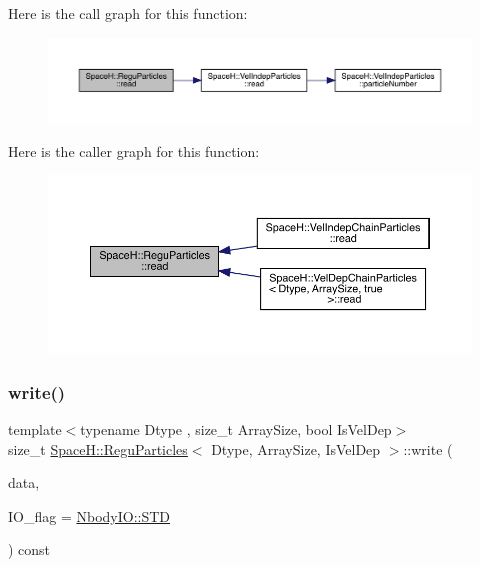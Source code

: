 Here is the call graph for this function\+:
\nopagebreak
\begin{figure}[H]
\begin{center}
\leavevmode
\includegraphics[width=350pt]{class_space_h_1_1_regu_particles_a639789e55a57427963b49a95c4e66c86_cgraph}
\end{center}
\end{figure}
Here is the caller graph for this function\+:
\nopagebreak
\begin{figure}[H]
\begin{center}
\leavevmode
\includegraphics[width=350pt]{class_space_h_1_1_regu_particles_a639789e55a57427963b49a95c4e66c86_icgraph}
\end{center}
\end{figure}
\mbox{\label{class_space_h_1_1_regu_particles_a5e6f99ab289e48790db7599fac59aa5a}} 
\subsubsection{\texorpdfstring{write()}{write()}}
{\footnotesize\ttfamily template$<$typename Dtype , size\+\_\+t Array\+Size, bool Is\+Vel\+Dep$>$ \\
size\+\_\+t \mbox{\hyperlink{class_space_h_1_1_regu_particles}{Space\+H\+::\+Regu\+Particles}}$<$ Dtype, Array\+Size, Is\+Vel\+Dep $>$\+::write (\begin{DoxyParamCaption}\item[{\mbox{\hyperlink{class_space_h_1_1_vel_indep_particles_abca40159a816385790d5a6fd19c1dc6d}{Scalar\+Buffer}} \&}]{data,  }\item[{const \mbox{\hyperlink{namespace_space_h_a296a8bae763a754564bfdce216e31b59}{Nbody\+IO}}}]{I\+O\+\_\+flag = {\ttfamily \mbox{\hyperlink{namespace_space_h_a296a8bae763a754564bfdce216e31b59ac6ce23be5d350ce18a665427d2d950f7}{Nbody\+I\+O\+::\+S\+TD}}} }\end{DoxyParamCaption}) const\hspace{0.3cm}{\ttfamily [inline]}}



